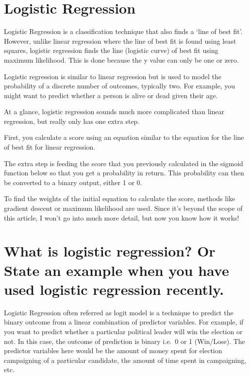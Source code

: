 \documentclass[
]{book}
\begin{document}
\hypertarget{logistic-regression}{%
\section{Logistic Regression}\label{logistic-regression}}

Logistic Regression is a classification technique that also finds a `line of best fit'. However, unlike linear regression where the line of best fit is found using least squares, logistic regression finds the line (logistic curve) of best fit using maximum likelihood. This is done because the y value can only be one or zero.

Logistic regression is similar to linear regression but is used to model the probability of a discrete number of outcomes, typically two. For example, you might want to predict whether a person is alive or dead given their age.

At a glance, logistic regression sounds much more complicated than linear regression, but really only has one extra step.

First, you calculate a score using an equation similar to the equation for the line of best fit for linear regression.

The extra step is feeding the score that you previously calculated in the sigmoid function below so that you get a probability in return. This probability can then be converted to a binary output, either 1 or 0.

To find the weights of the initial equation to calculate the score, methods like gradient descent or maximum likelihood are used. Since it's beyond the scope of this article, I won't go into much more detail, but now you know how it works!

\hypertarget{what-is-logistic-regression-or-state-an-example-when-you-have-used-logistic-regression-recently.}{%
\section{What is logistic regression? Or State an example when you have used logistic regression recently.}\label{what-is-logistic-regression-or-state-an-example-when-you-have-used-logistic-regression-recently.}}

Logistic Regression often referred as logit model is a technique to predict the binary outcome from a linear combination of predictor variables. For example, if you want to predict whether a particular political leader will win the election or not. In this case, the outcome of prediction is binary i.e.~0 or 1 (Win/Lose). The predictor variables here would be the amount of money spent for election campaigning of a particular candidate, the amount of time spent in campaigning, etc.
\end{document}
